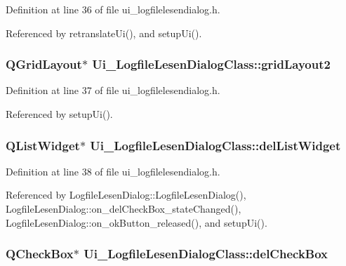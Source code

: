 Definition at line 36 of file ui\_\-logfilelesendialog.h.

Referenced by retranslateUi(), and setupUi().\hypertarget{class_ui___logfile_lesen_dialog_class_1bd0e843db42a19bc5c3729bafa669cb}{
\subsubsection[gridLayout2]{\setlength{\rightskip}{0pt plus 5cm}QGridLayout$\ast$ {\bf Ui\_\-LogfileLesenDialogClass::gridLayout2}}}
\label{class_ui___logfile_lesen_dialog_class_1bd0e843db42a19bc5c3729bafa669cb}




Definition at line 37 of file ui\_\-logfilelesendialog.h.

Referenced by setupUi().\hypertarget{class_ui___logfile_lesen_dialog_class_98e3d83577b746e629aaac0dfeda5b3e}{
\subsubsection[delListWidget]{\setlength{\rightskip}{0pt plus 5cm}QListWidget$\ast$ {\bf Ui\_\-LogfileLesenDialogClass::delListWidget}}}
\label{class_ui___logfile_lesen_dialog_class_98e3d83577b746e629aaac0dfeda5b3e}




Definition at line 38 of file ui\_\-logfilelesendialog.h.

Referenced by LogfileLesenDialog::LogfileLesenDialog(), LogfileLesenDialog::on\_\-delCheckBox\_\-stateChanged(), LogfileLesenDialog::on\_\-okButton\_\-released(), and setupUi().\hypertarget{class_ui___logfile_lesen_dialog_class_3410e297816a8fe3b7efd3fcecd1aa0f}{
\subsubsection[delCheckBox]{\setlength{\rightskip}{0pt plus 5cm}QCheckBox$\ast$ {\bf Ui\_\-LogfileLesenDialogClass::delCheckBox}}}
\label{class_ui___logfile_lesen_dialog_class_3410e297816a8fe3b7efd3fcecd1aa0f}




